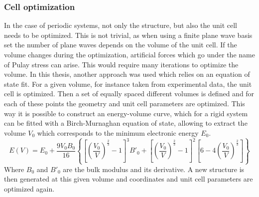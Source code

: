\subsubsection{Cell optimization}
In the case of periodic systems, not only the structure, but also the unit cell needs to be optimized. This is not trivial, as when using a finite plane wave basis set the number of plane waves depends on the volume of the unit cell. If the volume changes during the optimization, artificial forces which go under the name of Pulay stress can arise. This would require many iterations to optimize the volume. In this thesis, another approach was used \cite{Vanpoucke2015} which relies on an equation of state fit. For a given volume, for instance taken from experimental data, the unit cell is optimized. Then a set of equally spaced different volumes is defined and for each of these points the geometry and unit cell parameters are optimized. This way it is possible to construct an energy-volume curve, which for a rigid system can be fitted with a Birch-Murnaghan equation of state, allowing to extract the volume $V_0$ which corresponds to the minimum electronic energy $E_{0}$. 
\[
E(V) = E_{0} + 
\dfrac{9V_{0}B_{0}}{16}
\left\lbrace 
\left[\left(\dfrac{V_{0}}{V}\right)^{\frac{2}{3}} - 1\right]^{3} B'_{0} +
\left[\left(\dfrac{V_{0}}{V}\right)^{\frac{2}{3}} - 1\right]^{2}
\left[6 - 4\left(\dfrac{V_{0}}{V}\right)^{\frac{2}{3}}\right]
\right\rbrace
\]
Where $B_0$ and $B'_{0}$ are the bulk modulus and its derivative. A new structure is then generated at this given volume and coordinates and unit cell parameters are optimized again.

